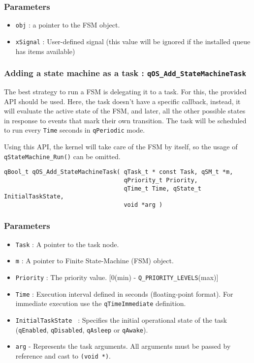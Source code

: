 \subsubsection*{Parameters}
\begin{itemize}
    \item \lstinline{obj} : a pointer to the FSM object.
    \item \lstinline{xSignal} :  User-defined signal (this value will be ignored if the installed queue has items available)
\end{itemize}  

\subsubsection{Adding a state machine as a task : \texorpdfstring{\lstinline{qOS_Add_StateMachineTask}}{qOS_Add_StateMachineTask} } \label{statemachinetask}
The best strategy to run a FSM is delegating it to a task. For this, the provided  API should be used. Here, the task doesn't have a specific callback, instead, it will evaluate the active state of the FSM, and later, all the other possible states in response to events that mark their own transition. The task will be scheduled to run every \lstinline{Time} seconds in \lstinline{qPeriodic} mode. 

Using this API, the kernel will take care of the FSM by itself, so the usage of \lstinline{qStateMachine_Run()} can be omitted. 
\medskip

\begin{lstlisting}[style=CStyle]
qBool_t qOS_Add_StateMachineTask( qTask_t * const Task, qSM_t *m, 
                                  qPriority_t Priority, 
                                  qTime_t Time, qState_t InitialTaskState,
                                  void *arg )
\end{lstlisting}

\subsubsection*{Parameters}
\begin{itemize}
    \item \lstinline{Task} : A pointer to the task node. 
    \item \lstinline{m} : A pointer to Finite State-Machine (FSM) object.
    \item \lstinline{Priority} : The priority value. [0(min) - \lstinline{Q_PRIORITY_LEVELS}(max)]
    \item \lstinline{Time} : Execution interval defined in seconds (floating-point format). For immediate execution use the  \lstinline{qTimeImmediate} definition. 
    \item \lstinline{InitialTaskState } : Specifies the initial operational state of the task (\lstinline{qEnabled}, \lstinline{qDisabled}, \lstinline{qAsleep} or \lstinline{qAwake}).
    \item \lstinline{arg} - Represents the task arguments. All arguments must be passed by reference and cast to \lstinline{(void *)}. 
\end{itemize}

